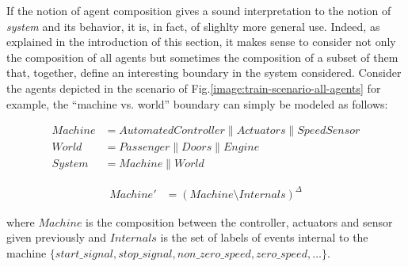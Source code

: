 If the notion of agent composition gives a sound interpretation to the notion of \emph{system} and its behavior, it is, in fact, of slighlty more general use. Indeed, as explained in the introduction of this section, it makes sense to consider not only the composition of all agents but sometimes the composition of a subset of them that, together, define an interesting boundary in the system considered. Consider the agents depicted in the scenario of Fig.\ref{image:train-scenario-all-agents} for example, the ``machine vs. world'' boundary can simply be modeled as follows:

\vspace{-0.8cm}
\begin{align*}
Machine &= AutomatedController \parallel Actuators \parallel SpeedSensor \\
World   &= Passenger \parallel Doors \parallel Engine \\
System  &= Machine \parallel World
\end{align*}
\vspace{-0.8cm}

\vspace{-0.8cm}
\begin{align*}
Machine' &= (Machine \setminus Internals)^\Delta
\end{align*}
\vspace{-0.8cm}

\noindent where $Machine$ is the composition between the controller, actuators and sensor given previously and $Internals$ is the set of labels of events internal to the machine $\{start\_signal,stop\_signal, non\_zero\_speed, zero\_speed, \ldots\}$.


